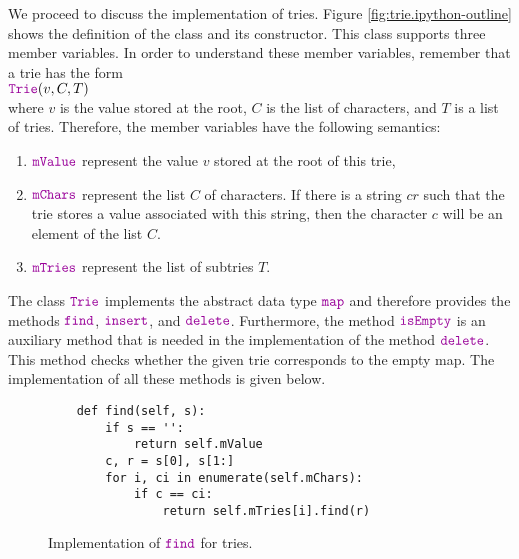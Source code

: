\noindent
We proceed to discuss the implementation of tries.  Figure \ref{fig:trie.ipython-outline} shows the
definition of the class  and its constructor.  This class supports three member variables.  In order to
understand these member variables, remember that a trie has the form
\\[0.2cm]
\hspace*{1.3cm}
$\mytt{Trie}(v, C, T)$
\\[0.2cm]
where $v$ is the value stored at the root, $C$ is the list of characters, and $T$ is a list of
tries.  Therefore, the member variables have the following semantics:
\begin{enumerate}
\item $\mytt{mValue}$ represent the value $v$ stored at the root of this trie,  
\item $\mytt{mChars}$ represent the list  $C$ of characters.  If there is a string $cr$ such that
      the trie stores a value associated with this string, then the character $c$ will be an element of
      the list $C$.
\item $\mytt{mTries}$ represent the list of subtries $T$.  
\end{enumerate}
The class $\mytt{Trie}$ implements the abstract data type $\mytt{map}$ and therefore provides the
methods $\mytt{find}$, $\mytt{insert}$, and $\mytt{delete}$.  Furthermore, the method
$\mytt{isEmpty}$ is an auxiliary method that is needed in the implementation of the method 
$\mytt{delete}$.  This method checks whether the given trie corresponds to the empty map.  The
implementation of all these methods is given below. 

\begin{figure}[!ht]
\centering
\begin{verbatim}
    def find(self, s):
        if s == '':
            return self.mValue
        c, r = s[0], s[1:]
        for i, ci in enumerate(self.mChars):
            if c == ci:
                return self.mTries[i].find(r)
\end{verbatim}
\vspace*{-0.3cm}
\caption{Implementation of $\mytt{find}$ for tries.}
\label{fig:trie.ipython-find}
\end{figure}

